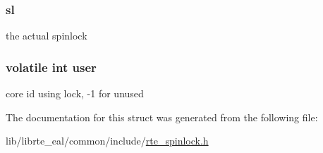 \subsubsection[{sl}]{ sl}\label{structrte__spinlock__recursive__t_afbea098cf5a01b98d8f3b58939aa4f49}
the actual spinlock \hypertarget{structrte__spinlock__recursive__t_a6c93cf1369e3cef58d8c4a5162272c76}{}
\subsubsection[{user}]{\setlength{\rightskip}{0pt plus 5cm}volatile int user}\label{structrte__spinlock__recursive__t_a6c93cf1369e3cef58d8c4a5162272c76}
core id using lock, -\/1 for unused 

The documentation for this struct was generated from the following file\+:\begin{DoxyCompactItemize}
\item 
lib/librte\+\_\+eal/common/include/\hyperlink{rte__spinlock_8h}{rte\+\_\+spinlock.\+h}\end{DoxyCompactItemize}
